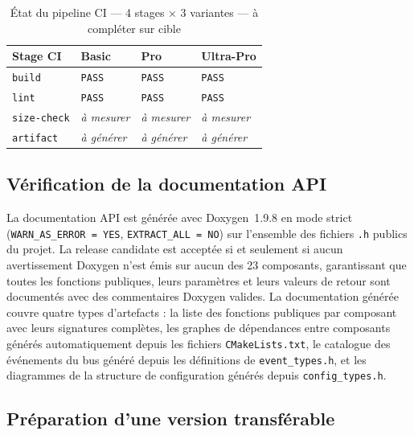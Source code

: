 \begin{table}[H]
\centering
\renewcommand{\arraystretch}{1.5}
\caption{État du pipeline CI — 4 stages × 3 variantes — à compléter sur cible}
\label{tab:ci_status}
\small
\begin{tabular}{|p{3.2cm}|p{2.5cm}|p{2.5cm}|p{2.5cm}|}
\hline
\rowcolor{gray!20}
\textbf{Stage CI} & \textbf{Basic} & \textbf{Pro} & \textbf{Ultra-Pro} \\
\hline
\texttt{build}       & \texttt{PASS} & \texttt{PASS} & \texttt{PASS} \\
\hline
\texttt{lint}        & \texttt{PASS} & \texttt{PASS} & \texttt{PASS} \\
\hline
\texttt{size-check}  & \textit{à mesurer} & \textit{à mesurer} & \textit{à mesurer} \\
\hline
\texttt{artifact}    & \textit{à générer} & \textit{à générer} & \textit{à générer} \\
\hline
\end{tabular}
\end{table}

\subsection{Vérification de la documentation API}
\label{subsec:doc_verif}

La documentation API est générée avec Doxygen~1.9.8 en mode strict
(\texttt{WARN\_AS\_ERROR = YES}, \texttt{EXTRACT\_ALL = NO}) sur
l'ensemble des fichiers \texttt{.h} publics du projet. La release
candidate est acceptée si et seulement si aucun avertissement Doxygen
n'est émis sur aucun des 23 composants, garantissant que toutes les
fonctions publiques, leurs paramètres et leurs valeurs de retour sont
documentés avec des commentaires Doxygen valides. La documentation
générée couvre quatre types d'artefacts : la liste des fonctions
publiques par composant avec leurs signatures complètes, les graphes
de dépendances entre composants générés automatiquement depuis les
fichiers \texttt{CMakeLists.txt}, le catalogue des événements du bus
généré depuis les définitions de \texttt{event\_types.h}, et les
diagrammes de la structure de configuration générés depuis
\texttt{config\_types.h}.

\subsection{Préparation d'une version transférable}
\label{subsec:transfer_ver}

